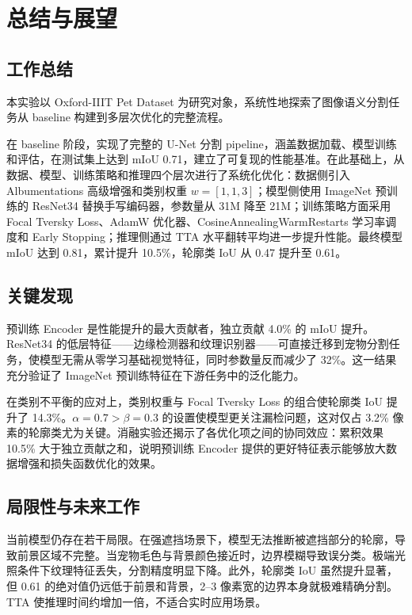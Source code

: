 \chapter{总结与展望}
\label{chap:conclusion}

\section{工作总结}

本实验以 Oxford-IIIT Pet Dataset 为研究对象，系统性地探索了图像语义分割任务从 baseline 构建到多层次优化的完整流程。

在 baseline 阶段，实现了完整的 U-Net 分割 pipeline，涵盖数据加载、模型训练和评估，在测试集上达到 mIoU 0.71，建立了可复现的性能基准。在此基础上，从数据、模型、训练策略和推理四个层次进行了系统化优化：数据侧引入 Albumentations 高级增强和类别权重 $w=[1,1,3]$；模型侧使用 ImageNet 预训练的 ResNet34 替换手写编码器，参数量从 31M 降至 21M；训练策略方面采用 Focal Tversky Loss、AdamW 优化器、CosineAnnealingWarmRestarts 学习率调度和 Early Stopping；推理侧通过 TTA 水平翻转平均进一步提升性能。最终模型 mIoU 达到 0.81，累计提升 10.5\%，轮廓类 IoU 从 0.47 提升至 0.61。

\section{关键发现}

预训练 Encoder 是性能提升的最大贡献者，独立贡献 4.0\% 的 mIoU 提升。ResNet34 的低层特征——边缘检测器和纹理识别器——可直接迁移到宠物分割任务，使模型无需从零学习基础视觉特征，同时参数量反而减少了 32\%。这一结果充分验证了 ImageNet 预训练特征在下游任务中的泛化能力。

在类别不平衡的应对上，类别权重与 Focal Tversky Loss 的组合使轮廓类 IoU 提升了 14.3\%。$\alpha=0.7 > \beta=0.3$ 的设置使模型更关注漏检问题，这对仅占 3.2\% 像素的轮廓类尤为关键。消融实验还揭示了各优化项之间的协同效应：累积效果 10.5\% 大于独立贡献之和，说明预训练 Encoder 提供的更好特征表示能够放大数据增强和损失函数优化的效果。

\section{局限性与未来工作}

当前模型仍存在若干局限。在强遮挡场景下，模型无法推断被遮挡部分的轮廓，导致前景区域不完整。当宠物毛色与背景颜色接近时，边界模糊导致误分类。极端光照条件下纹理特征丢失，分割精度明显下降。此外，轮廓类 IoU 虽然提升显著，但 0.61 的绝对值仍远低于前景和背景，2--3 像素宽的边界本身就极难精确分割。TTA 使推理时间约增加一倍，不适合实时应用场景。

